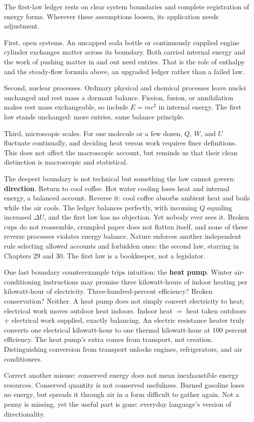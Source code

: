 \begin{mainline}
The first-law ledger rests on clear system boundaries and complete registration of energy forms. Wherever these assumptions loosen, its application needs adjustment.

First, open systems. An uncapped soda bottle or continuously supplied engine cylinder exchanges matter across its boundary. Both carried internal energy and the work of pushing matter in and out need entries. That is the role of enthalpy and the steady-flow formula above, an upgraded ledger rather than a failed law.

Second, nuclear processes. Ordinary physical and chemical processes leave nuclei unchanged and rest mass a dormant balance. Fission, fusion, or annihilation makes rest mass exchangeable, so include \(E=mc^2\) in internal energy. The first law stands unchanged: more entries, same balance principle.

Third, microscopic scales. For one molecule or a few dozen, \(Q\), \(W\), and \(U\) fluctuate continually, and deciding heat versus work requires finer definitions. This does not affect the macroscopic account, but reminds us that their clean distinction is macroscopic and statistical.

The deepest boundary is not technical but something the law cannot govern: \textbf{direction}. Return to cool coffee. Hot water cooling loses heat and internal energy, a balanced account. Reverse it: cool coffee absorbs ambient heat and boils while the air cools. The ledger balances perfectly, with incoming \(Q\) equaling increased \(\Delta U\), and the first law has no objection. Yet nobody ever sees it. Broken cups do not reassemble, crumpled paper does not flatten itself, and none of these reverse processes violates energy balance. Nature enforces another independent rule selecting allowed accounts and forbidden ones: the second law, starring in Chapters 29 and 30. The first law is a bookkeeper, not a legislator.

One last boundary counterexample trips intuition: the \textbf{heat pump}. Winter air-conditioning instructions may promise three kilowatt-hours of indoor heating per kilowatt-hour of electricity. Three-hundred-percent efficiency? Broken conservation? Neither. A heat pump does not simply convert electricity to heat; electrical work moves outdoor heat indoors. Indoor heat \(=\) heat taken outdoors \(+\) electrical work supplied, exactly balancing. An electric resistance heater truly converts one electrical kilowatt-hour to one thermal kilowatt-hour at 100 percent efficiency. The heat pump's extra comes from transport, not creation. Distinguishing conversion from transport unlocks engines, refrigerators, and air conditioners.

Correct another misuse: conserved energy does not mean inexhaustible energy resources. Conserved quantity is not conserved usefulness. Burned gasoline loses no energy, but spreads it through air in a form difficult to gather again. Not a penny is missing, yet the useful part is gone: everyday language's version of directionality.
\end{mainline}

